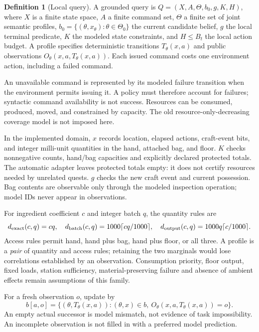 \documentclass[11pt]{article}
\theoremstyle{definition}
\newtheorem{definition}[theorem]{Definition}
\begin{document}
\begin{definition}[Local query]
A grounded query is $Q=(X,A,\Theta,b_0,g,K,H)$, where $X$ is a finite state
space, $A$ a finite command set, $\Theta$ a finite set of joint semantic profiles,
$b_0=\{(\theta,x_\theta):\theta\in\Theta_0\}$ the current candidate belief,
$g$ the local terminal predicate, $K$ the modeled state constraints, and
$H\leq B_t$ the local action budget. A profile specifies deterministic transitions
$T_\theta(x,a)$ and public observations $O_\theta(x,a,T_\theta(x,a))$.
Each issued command costs one environment action, including a failed command.
\end{definition}
An unavailable command is represented by its modeled failure transition when the
environment permits issuing it. A policy must therefore account for failures;
syntactic command availability is not success. Resources can be consumed,
produced, moved, and constrained by capacity. The old resource-only-decreasing
coverage model is not imposed here.

In the implemented domain, $x$ records location, elapsed actions, craft-event
bits, and integer milli-unit quantities in the hand, attached bag, and floor.
$K$ checks nonnegative counts, hand/bag capacities and explicitly declared
protected totals. The automatic adapter leaves protected totals empty: it does
not certify resources needed by unrelated quests. $g$ checks the new craft event
and current possession. Bag contents are observable only through the modeled
inspection operation; model IDs never appear in observations.

For ingredient coefficient $c$ and integer batch $q$, the quantity rules are
\[
 d_{\rm exact}(c,q)=cq,\quad
 d_{\rm batch}(c,q)=1000\lceil cq/1000\rceil,\quad
 d_{\rm output}(c,q)=1000q\lceil c/1000\rceil.
\]
Access rules permit hand, hand plus bag, hand plus floor, or all three. A profile
is a \emph{pair} of quantity and access rules; retaining the two marginals would
lose correlations established by an observation. Consumption priority, floor
output, fixed loads, station sufficiency, material-preserving failure and absence
of ambient effects remain assumptions of this family.

For a fresh observation $o$, update by
\begin{equation}\label{eq:update}
 b[a,o]=\{(\theta,T_\theta(x,a)):(\theta,x)\in b,\
 O_\theta(x,a,T_\theta(x,a))=o\}.
\end{equation}
An empty actual successor is model mismatch, not evidence of task impossibility.
An incomplete observation is not filled in with a preferred model prediction.
\end{document}
